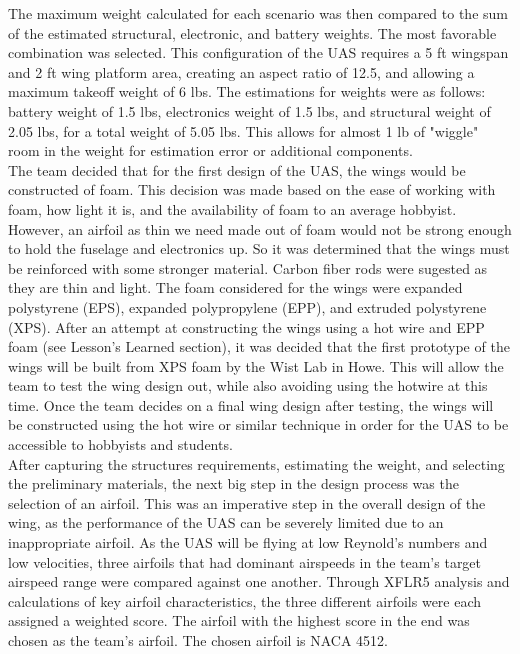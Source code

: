 ﻿\documentclass{article}
\begin{document}
\noindent The maximum weight calculated for each scenario was then compared to the sum of the estimated structural, electronic, and battery weights. The most favorable combination was selected. This configuration of the UAS requires a 5 ft wingspan and 2 ft wing platform area, creating an aspect ratio of 12.5, and allowing a maximum takeoff weight of 6 lbs. The estimations for weights were as follows: battery weight of 1.5 lbs, electronics weight of 1.5 lbs, and structural weight of 2.05 lbs, for a total weight of 5.05 lbs. This allows for almost 1 lb of "wiggle" room in the weight for estimation error or additional components.\\

\noindent The team decided that for the first design of the UAS, the wings would be constructed of foam. This decision was made based on the ease of working with foam, how light it is, and the availability of foam to an average hobbyist. However, an airfoil as thin we need made out of foam would not be strong enough to hold the fuselage and electronics up. So it was determined that the wings must be reinforced with some stronger material. Carbon fiber rods were sugested as they are thin and light. The foam considered for the wings were expanded polystyrene (EPS), expanded polypropylene (EPP), and extruded polystyrene (XPS). After an attempt at constructing the wings using a hot wire and EPP foam (see Lesson’s Learned section), it was decided that the first prototype of the wings will be built from XPS foam by the Wist Lab in Howe. This will allow the team to test the wing design out, while also avoiding using the hotwire at this time. Once the team decides on a final wing design after testing, the wings will be constructed using the hot wire or similar technique in order for the UAS to be accessible to hobbyists and students.\\

\noindent After capturing the structures requirements, estimating the weight, and selecting the preliminary materials, the next big step in the design process was the selection of an airfoil. This was an imperative step in the overall design of the wing, as the performance of the UAS can be severely limited due to an inappropriate airfoil. As the UAS will be flying at low Reynold’s numbers and low velocities, three airfoils that had dominant airspeeds in the team’s target airspeed range were compared against one another. Through XFLR5 analysis and calculations of key airfoil characteristics, the three different airfoils were each assigned a weighted score. The airfoil with the highest score in the end was chosen as the team’s airfoil. The chosen airfoil is NACA 4512.\\
\end{document}
